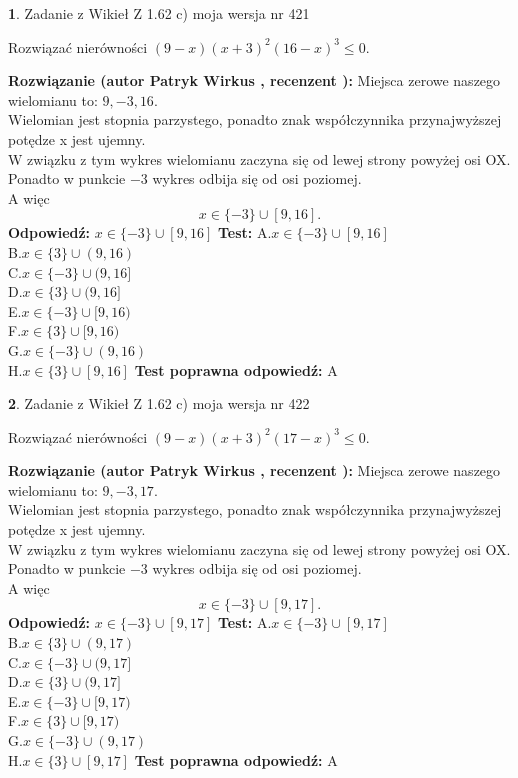\documentclass[12pt, a4paper]{article}
\theoremstyle{definition} %
\newtheorem{zad}{}
\newcommand{\zadStart}[1]{\begin{zad}#1\newline}
\newcommand{\zadStop}{\end{zad}}
\newcommand{\rozwStart}[2]{\noindent \textbf{Rozwiązanie (autor #1 , recenzent #2): }\newline}
\newcommand{\rozwStop}{\newline}
\newcommand{\odpStart}{\noindent \textbf{Odpowiedź:}\newline}
\newcommand{\odpStop}{\newline}
\newcommand{\testStart}{\noindent \textbf{Test:}\newline}
\newcommand{\testStop}{\newline}
\newcommand{\kluczStart}{\noindent \textbf{Test poprawna odpowiedź:}\newline}
\newcommand{\kluczStop}{\newline}
\begin{document}
\zadStart{Zadanie z Wikieł Z 1.62 c) moja wersja nr 421}

Rozwiązać nierówności $(9-x)(x+3)^{2}(16-x)^{3}\le0$.
\zadStop
\rozwStart{Patryk Wirkus}{}
Miejsca zerowe naszego wielomianu to: $9, -3, 16$.\\
Wielomian jest stopnia parzystego, ponadto znak współczynnika przy\linebreak najwyższej potędze x jest ujemny.\\ W związku z tym wykres wielomianu zaczyna się od lewej strony powyżej osi OX.\\
Ponadto w punkcie $-3$ wykres odbija się od osi poziomej.\\
A więc $$x \in \{-3\} \cup [9,16].$$
\rozwStop
\odpStart
$x \in \{-3\} \cup [9,16]$
\odpStop
\testStart
A.$x \in \{-3\} \cup [9,16]$\\
B.$x \in \{3\} \cup (9,16)$\\
C.$x \in \{-3\} \cup (9,16]$\\
D.$x \in \{3\} \cup (9,16]$\\
E.$x \in \{-3\} \cup [9,16)$\\
F.$x \in \{3\} \cup [9,16)$\\
G.$x \in \{-3\} \cup (9,16)$\\
H.$x \in \{3\} \cup [9,16]$
\testStop
\kluczStart
A
\kluczStop



\zadStart{Zadanie z Wikieł Z 1.62 c) moja wersja nr 422}

Rozwiązać nierówności $(9-x)(x+3)^{2}(17-x)^{3}\le0$.
\zadStop
\rozwStart{Patryk Wirkus}{}
Miejsca zerowe naszego wielomianu to: $9, -3, 17$.\\
Wielomian jest stopnia parzystego, ponadto znak współczynnika przy\linebreak najwyższej potędze x jest ujemny.\\ W związku z tym wykres wielomianu zaczyna się od lewej strony powyżej osi OX.\\
Ponadto w punkcie $-3$ wykres odbija się od osi poziomej.\\
A więc $$x \in \{-3\} \cup [9,17].$$
\rozwStop
\odpStart
$x \in \{-3\} \cup [9,17]$
\odpStop
\testStart
A.$x \in \{-3\} \cup [9,17]$\\
B.$x \in \{3\} \cup (9,17)$\\
C.$x \in \{-3\} \cup (9,17]$\\
D.$x \in \{3\} \cup (9,17]$\\
E.$x \in \{-3\} \cup [9,17)$\\
F.$x \in \{3\} \cup [9,17)$\\
G.$x \in \{-3\} \cup (9,17)$\\
H.$x \in \{3\} \cup [9,17]$
\testStop
\kluczStart
A
\kluczStop
\end{document}
